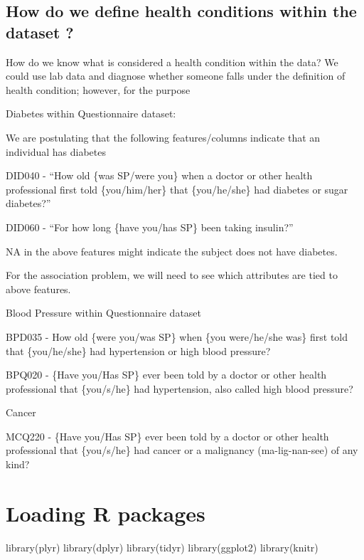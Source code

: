 \hypertarget{how-do-we-define-health-conditions-within-the-dataset}{%
\subsection{How do we define health conditions within the dataset
?}\label{how-do-we-define-health-conditions-within-the-dataset}}

How do we know what is considered a health condition within the data? We
could use lab data and diagnose whether someone falls under the
definition of health condition; however, for the purpose

Diabetes within Questionnaire dataset:

We are postulating that the following features/columns indicate that an
individual has diabetes

DID040 - ``How old \{was SP/were you\} when a doctor or other health
professional first told \{you/him/her\} that \{you/he/she\} had diabetes
or sugar diabetes?''

DID060 - ``For how long \{have you/has SP\} been taking insulin?''

NA in the above features might indicate the subject does not have
diabetes.

For the association problem, we will need to see which attributes are
tied to above features.

Blood Pressure within Questionnaire dataset

BPD035 - How old \{were you/was SP\} when \{you were/he/she was\} first
told that \{you/he/she\} had hypertension or high blood pressure?

BPQ020 - \{Have you/Has SP\} ever been told by a doctor or other health
professional that \{you/s/he\} had hypertension, also called high blood
pressure?

Cancer

MCQ220 - \{Have you/Has SP\} ever been told by a doctor or other health
professional that \{you/s/he\} had cancer or a malignancy
(ma-lig-nan-see) of any kind?

\hypertarget{loading-r-packages}{%
\section{Loading R packages}\label{loading-r-packages}}

\begin{Schunk}
\begin{Sinput}
library(plyr)
library(dplyr)
library(tidyr)
library(ggplot2)
library(knitr)
\end{Sinput}
\end{Schunk}

